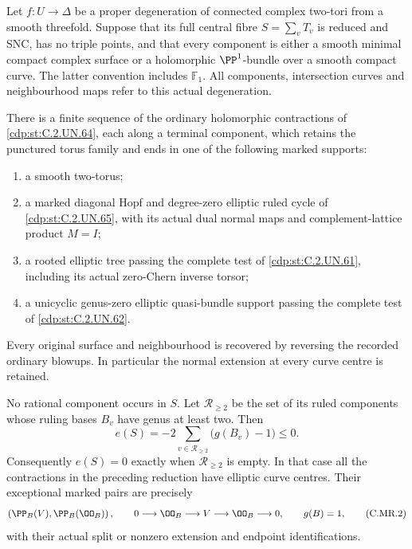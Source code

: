 
\begin{proposition}\label{cdp:st:C.2.UN.66}
Let $f:U\to\Delta$ be a proper degeneration of connected complex
two-tori from a smooth threefold. Suppose that its full central
fibre $S=\sum_vT_v$ is reduced and SNC, has no triple points,
and that every component is either a smooth minimal compact
complex surface or a holomorphic $\PP^1$-bundle over a smooth
compact curve. The latter convention includes $\mathbb F_1$.
All components, intersection curves and neighbourhood maps refer
to this actual degeneration.

There is a finite sequence of the ordinary holomorphic
contractions of \ref{cdp:st:C.2.UN.64}, each along a terminal component, which
retains the punctured torus family and ends in one of the
following marked supports:
\begin{enumerate}
\item a smooth two-torus;
\item a marked diagonal Hopf and degree-zero elliptic ruled
cycle of \ref{cdp:st:C.2.UN.65}, with its actual dual normal maps and
complement-lattice product $M=I$;
\item a rooted elliptic tree passing the complete test of
\ref{cdp:st:C.2.UN.61}, including its actual zero-Chern inverse torsor;
\item a unicyclic genus-zero elliptic quasi-bundle support
passing the complete test of \ref{cdp:st:C.2.UN.62}.
\end{enumerate}
Every original surface and neighbourhood is recovered by
reversing the recorded ordinary blowups. In particular the
normal extension at every curve centre is retained.

No rational component occurs in $S$. Let $\mathcal R_{\ge2}$
be the set of its ruled components whose ruling bases $B_v$
have genus at least two. Then
\[
 e(S)=-2\sum_{v\in\mathcal R_{\ge2}}\bigl(g(B_v)-1\bigr)
                                                        \le0.
\tag{C.MR.1}\label{cdp:eq:C.MR.1}
\]
Consequently $e(S)=0$ exactly when $\mathcal R_{\ge2}$ is
empty. In that case all the contractions in the preceding
reduction have elliptic curve centres. Their exceptional
marked pairs are precisely
\[
 \left(\PP_B(V),\PP_B(\OO_B)\right),
 \qquad
 0\longrightarrow\OO_B\longrightarrow V
             \longrightarrow\OO_B\longrightarrow0,
 \qquad g(B)=1,
\tag{C.MR.2}\label{cdp:eq:C.MR.2}
\]
with their actual split or nonzero extension and endpoint
identifications.


\end{proposition}
